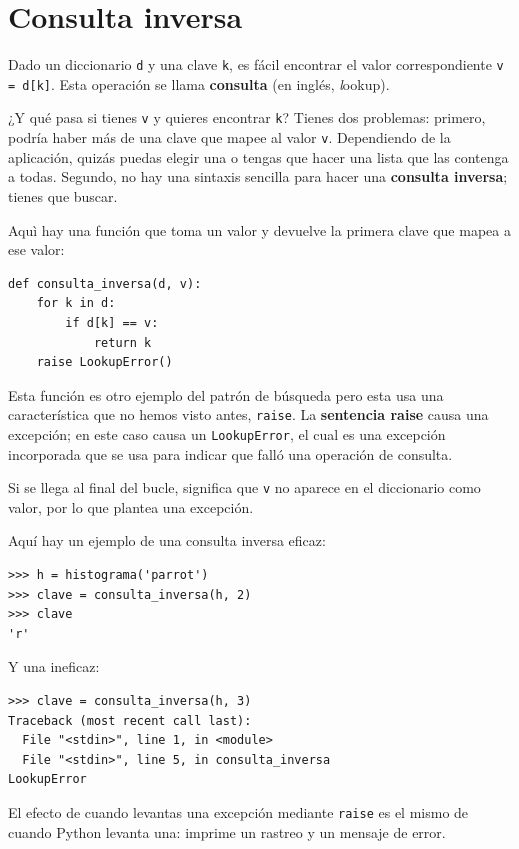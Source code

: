 \documentclass[10pt]{book}
\begin{document}
\section{Consulta inversa}
\label{raise}

Dado un diccionario {\tt d} y una clave {\tt k}, es fácil
encontrar el valor correspondiente {\tt v = d[k]}.  Esta operación
se llama {\bf consulta} (en inglés, {\emph lookup}).

¿Y qué pasa si tienes {\tt v} y quieres encontrar {\tt k}?
Tienes dos problemas: primero, podría haber más de una
clave que mapee al valor {\tt v}.  Dependiendo de la aplicación,
quizás puedas elegir una o tengas que hacer
una lista que las contenga a todas.  Segundo, no hay
una sintaxis sencilla para hacer una {\bf consulta inversa}; tienes que buscar.

Aquì hay una función que toma un valor y devuelve la primera
clave que mapea a ese valor:

\begin{verbatim}
def consulta_inversa(d, v):
    for k in d:
        if d[k] == v:
            return k
    raise LookupError()
\end{verbatim}
%
Esta función es otro ejemplo del patrón de búsqueda pero esta
usa una característica que no hemos visto antes, {\tt raise}.  La
{\bf sentencia raise} causa una excepción; en este caso causa un
{\tt LookupError}, el cual es una excepción incorporada que se usa para indicar
que falló una operación de consulta.
  
 

Si se llega al final del bucle, significa que {\tt v}
no aparece en el diccionario como valor, por lo que plantea una
excepción.

Aquí hay un ejemplo de una consulta inversa eficaz:

\begin{verbatim}
>>> h = histograma('parrot')
>>> clave = consulta_inversa(h, 2)
>>> clave 
'r'
\end{verbatim}
%
Y una ineficaz:

\begin{verbatim}
>>> clave = consulta_inversa(h, 3)
Traceback (most recent call last):
  File "<stdin>", line 1, in <module>
  File "<stdin>", line 5, in consulta_inversa
LookupError
\end{verbatim}
%
El efecto de cuando levantas una excepción mediante {\tt raise} es el mismo de cuando
Python levanta una: imprime un rastreo y un mensaje de error.
\end{document}
